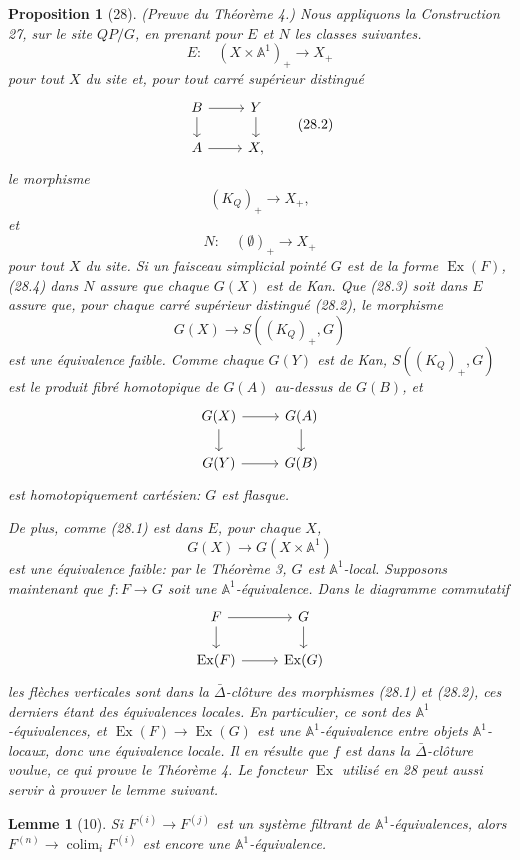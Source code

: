 \documentclass[11pt]{article}
\newcommand{\Aone}{\mathbb A^1}
\theoremstyle{deligne}
\newtheorem*{proposition*}{Proposition}
\newtheorem*{lemma*}{Lemme}
\newcommand{\colim}{\operatorname{colim}}
\newcommand{\Ex}{\operatorname{Ex}}
\begin{document}
\begin{proposition*}[28]
(Preuve du Théorème 4.) Nous appliquons la Construction 27, sur le site \(QP/G\), en prenant pour \(E\) et \(N\) les classes suivantes.
\[
E:\quad (X\times \Aone)_+\longrightarrow X_+ \tag{28.1}
\]
pour tout \(X\) du site et, pour tout carré supérieur distingué
\[
\begin{tikzcd}[column sep=2.4em,row sep=1.5em]
B \arrow[r] \arrow[d] & Y \arrow[d] \\
A \arrow[r] & X,
\end{tikzcd}
\tag{28.2}
\]
le morphisme
\[
(K_Q)_+\longrightarrow X_+,
\tag{28.3}
\]
et
\[
N:\quad (\emptyset)_+\longrightarrow X_+
\tag{28.4}
\]
pour tout \(X\) du site. Si un faisceau simplicial pointé \(G\) est de la forme \(\Ex(F)\), (28.4) dans \(N\) assure que chaque \(G(X)\) est de Kan. Que (28.3) soit dans \(E\) assure que, pour chaque carré supérieur distingué (28.2), le morphisme
\[
G(X)\longrightarrow S((K_Q)_+,G)
\]
est une équivalence faible. Comme chaque \(G(Y)\) est de Kan, \(S((K_Q)_+,G)\) est le produit fibré homotopique de \(G(A)\) au-dessus de \(G(B)\), et
\[
\begin{tikzcd}[column sep=2.6em,row sep=1.6em]
G(X) \arrow[r] \arrow[d] & G(A) \arrow[d] \\
G(Y) \arrow[r] & G(B)
\end{tikzcd}
\]
est homotopiquement cartésien: \(G\) est flasque.

De plus, comme (28.1) est dans \(E\), pour chaque \(X\),
\[
G(X)\longrightarrow G(X\times\Aone)
\]
est une équivalence faible: par le Théorème 3, \(G\) est \(\Aone\)-local. Supposons maintenant que \(f:F\to G\) soit une \(\Aone\)-équivalence. Dans le diagramme commutatif
\[
\begin{tikzcd}[column sep=2.6em,row sep=1.6em]
F \arrow[r] \arrow[d] & G \arrow[d] \\
\Ex(F) \arrow[r] & \Ex(G)
\end{tikzcd}
\]
les flèches verticales sont dans la \(\bar\Delta\)-clôture des morphismes (28.1) et (28.2), ces derniers étant des équivalences locales. En particulier, ce sont des \(\Aone\)-équivalences, et \(\Ex(F)\to\Ex(G)\) est une \(\Aone\)-équivalence entre objets \(\Aone\)-locaux, donc une équivalence locale. Il en résulte que \(f\) est dans la \(\bar\Delta\)-clôture voulue, ce qui prouve le Théorème 4. Le foncteur \(\Ex\) utilisé en 28 peut aussi servir à prouver le lemme suivant.
\end{proposition*}

\begin{lemma*}[10]
Si \(F^{(i)}\to F^{(j)}\) est un système filtrant de \(\Aone\)-équivalences, alors \(F^{(n)}\to \colim_iF^{(i)}\) est encore une \(\Aone\)-équivalence.
\end{lemma*}
\end{document}
